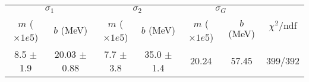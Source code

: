 \begin{tabular}{cc|cc|cc||c}
\multicolumn{2}{c|}{$\sigma_1$} & \multicolumn{2}{|c}{$\sigma_2$} & \multicolumn{2}{|c}{$\sigma_G$}  & \multirow{2}{*}{$\chi^2/$ndf}\\
$m$ ($\times1e5$) & $b$ (MeV) & $m$ ($\times1e5$) & $b$ (MeV) & $m$ ($\times1e5$) & $b$ (MeV) & \\
\hline
8.5 $\pm$ 1.9 & 20.03 $\pm$ 0.88 & 7.7 $\pm$ 3.8 & 35.0 $\pm$ 1.4 & 20.24 & 57.45 & 399/392\\
\end{tabular}

